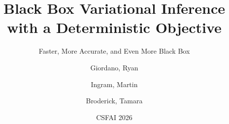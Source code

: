 \documentclass[8pt]{beamer}\usepackage[]{graphicx}\usepackage[]{color}
\begin{document}

\title{Black Box Variational Inference\\\hspace{1em}with a Deterministic Objective}

\subtitle{Faster, More Accurate, and Even More Black Box} 
\date{CSFAI 2026}

\author{Giordano, Ryan  \and Ingram, Martin \and Broderick, Tamara}



\frame{\titlepage}

\end{document}
